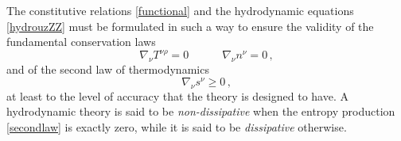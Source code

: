 \documentclass[a4paper, amsfonts, amssymb, amsmath, reprint, twocolumn, showkeys, nofootinbib]{revtex4-2}
\begin{document}
The constitutive relations \eqref{functional} and the hydrodynamic equations \eqref{hydrouzZZ} must be formulated in such a way to ensure the validity of the fundamental conservation laws
\begin{equation}
\label{conservotutto}
\nabla_\nu T^{\nu \rho}=0 \quad   \quad \quad    \nabla_\nu n^\nu =0 \, ,
\end{equation} 
and of the second law of thermodynamics
\begin{equation}
\label{secondlaw}
\nabla_\nu s^\nu \geq 0 \, ,
\end{equation}
at least to the level of accuracy that the theory is designed to have. A hydrodynamic theory is said to be \emph{non-dissipative} when the entropy production \eqref{secondlaw} is exactly zero, while it is said to be \emph{dissipative} otherwise. 
\end{document}
